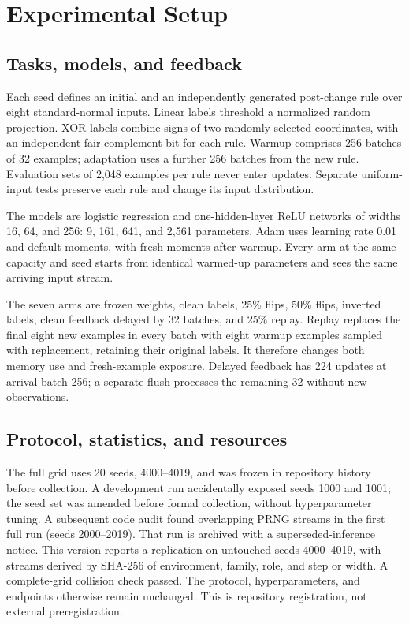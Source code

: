 \documentclass[11pt]{article}
\begin{document}
\section{Experimental Setup}
\subsection{Tasks, models, and feedback}
Each seed defines an initial and an independently generated post-change rule
over eight standard-normal inputs. Linear labels threshold a normalized random
projection. XOR labels combine signs of two randomly selected coordinates,
with an independent fair complement bit for each rule. Warmup comprises 256
batches of 32 examples; adaptation uses a further 256 batches from the new
rule. Evaluation sets of 2,048 examples per rule never enter updates. Separate
uniform-input tests preserve each rule and change its input distribution.

The models are logistic regression and one-hidden-layer ReLU networks of
widths 16, 64, and 256: 9, 161, 641, and 2,561 parameters. Adam uses learning
rate 0.01 and default moments, with fresh moments after warmup. Every arm at
the same capacity and seed starts from identical warmed-up parameters and
sees the same arriving input stream.

The seven arms are frozen weights, clean labels, 25\% flips, 50\% flips,
inverted labels, clean feedback delayed by 32 batches, and 25\% replay.
Replay replaces the final eight new examples in every batch with eight
warmup examples sampled with replacement, retaining their original labels.
It therefore changes both memory use and fresh-example exposure. Delayed
feedback has 224 updates at arrival batch 256; a separate flush processes
the remaining 32 without new observations.

\subsection{Protocol, statistics, and resources}
The full grid uses 20 seeds, 4000--4019, and was frozen in repository history
before collection. A development run accidentally exposed seeds 1000 and 1001;
the seed set was amended before formal collection, without hyperparameter
tuning. A subsequent code audit found overlapping PRNG streams in the first
full run (seeds 2000--2019). That run is archived with a superseded-inference
notice. This version reports a replication on untouched seeds 4000--4019,
with streams derived by SHA-256 of environment, family, role, and step or
width. A complete-grid collision check passed. The protocol, hyperparameters,
and endpoints otherwise remain unchanged. This is repository registration,
not external preregistration.
\end{document}
